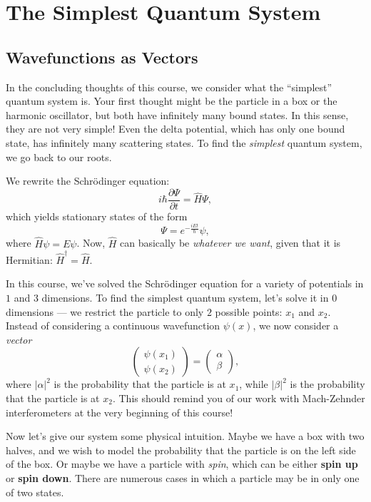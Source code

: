 \section{The Simplest Quantum System}
\subsection{Wavefunctions as Vectors}\label{wavefunctions_as_vectors}

In the concluding thoughts of this course, we consider what the ``simplest'' quantum system is. Your first thought might be the particle in a box or the harmonic oscillator, but both have infinitely many bound states. In this sense, they are not very simple! Even the delta potential, which has only one bound state, has infinitely many scattering states. To find the \textit{simplest} quantum system, we go back to our roots.

We rewrite the Schrödinger equation: $$i\hbar\frac{\partial\Psi}{\partial t}=\hat{H}\Psi,$$which yields stationary states of the form $$\Psi=e^{-\frac{iEt}{\hbar}}\psi,$$where $\hat{H}\psi=E\psi$. Now, $\hat{H}$ can basically be \textit{whatever we want}, given that it is Hermitian: $\hat{H}^\dagger=\hat{H}$. 

In this course, we've solved the Schrödinger equation for a variety of potentials in $1$ and $3$ dimensions. To find the simplest quantum system, let's solve it in $0$ dimensions --- we restrict the particle to only $2$ possible points: $x_1$ and $x_2$. Instead of considering a continuous wavefunction $\psi(x)$, we now consider a \textit{vector} $$\begin{pmatrix} \psi(x_1) \\ \psi(x_2) \end{pmatrix}=\begin{pmatrix} \alpha \\ \beta \end{pmatrix},$$where $|\alpha|^2$ is the probability that the particle is at $x_1$, while $|\beta|^2$ is the probability that the particle is at $x_2$. This should remind you of our work with Mach-Zehnder interferometers at the very beginning of this course!

Now let's give our system some physical intuition. Maybe we have a box with two halves, and we wish to model the probability that the particle is on the left side of the box. Or maybe we have a particle with \textit{spin}, which can be either \textbf{spin up} or \textbf{spin down}. There are numerous cases in which a particle may be in only one of two states.


